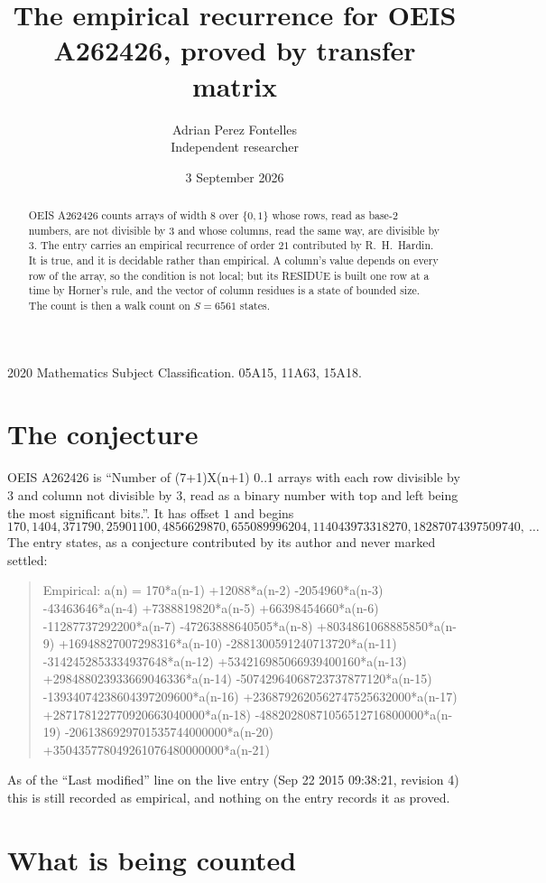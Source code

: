 \documentclass[11pt,a4paper]{article}
\title{The empirical recurrence for OEIS A262426, proved by transfer matrix}
\author{Adrian Perez Fontelles\\ \small Independent researcher}
\date{3 September 2026}
\theoremstyle{plain}
\theoremstyle{definition}
\begin{document}
\maketitle

\begin{abstract}
OEIS A262426 counts arrays of width $8$ over $\{0,1\}$ whose rows, read as base-$2$
numbers, are not divisible by $3$ and whose columns, read the same way, are divisible by
$3$. The entry carries an empirical recurrence of order $21$ contributed by
R.~H.~Hardin. It is true, and it is decidable rather than empirical. A column's value depends on
every row of the array, so the condition is not local; but its RESIDUE is built one row at a
time by Horner's rule, and the vector of column residues is a state of bounded size. The count
is then a walk count on $S=6561$ states.
\end{abstract}

\noindent\small 2020 Mathematics Subject Classification. 05A15, 11A63, 15A18.\normalsize

\section{The conjecture}

OEIS A262426 is ``Number of (7+1)X(n+1) 0..1 arrays with each row divisible by 3 and column not divisible by 3, read as a binary number with top and left being the most significant bits.''. It has offset $1$ and begins
\[
170, 1404, 371790, 25901100, 4856629870, 655089996204, 114043973318270, 18287074397509740,\ \dots
\]
The entry states, as a conjecture contributed by its author and never marked settled:
\begin{quote}
Empirical: a(n) = 170*a(n-1) +12088*a(n-2) -2054960*a(n-3) -43463646*a(n-4) +7388819820*a(n-5) +66398454660*a(n-6) -11287737292200*a(n-7) -47263888640505*a(n-8) +8034861068885850*a(n-9) +16948827007298316*a(n-10) -2881300591240713720*a(n-11) -3142452853334937648*a(n-12) +534216985066939400160*a(n-13) +298488023933669046336*a(n-14) -50742964068723737877120*a(n-15) -13934074238604397209600*a(n-16) +2368792620562747525632000*a(n-17) +287178122770920663040000*a(n-18) -48820280871056512716800000*a(n-19) -2061386929701535744000000*a(n-20) +350435778049261076480000000*a(n-21)
\end{quote}
As of the ``Last modified'' line on the live entry (Sep 22 2015 09:38:21, revision 4) this is still
recorded as empirical, and nothing on the entry records it as proved.

\section{What is being counted}
\end{document}
